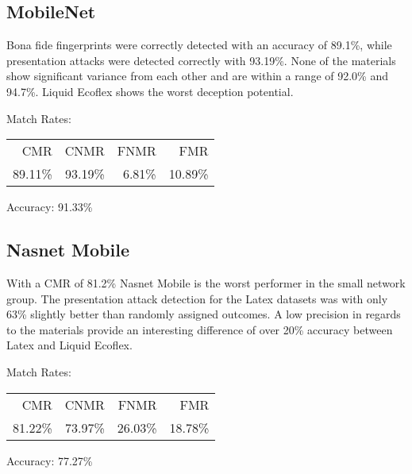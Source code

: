 \subsection{MobileNet}
\begin{minipage}[c]{0.7\textwidth}
    Bona fide fingerprints were correctly detected with an accuracy of 89.1\%, while presentation attacks were detected correctly with 93.19\%.
    None of the materials show significant variance from each other and are within a range of 92.0\% and 94.7\%.
    Liquid Ecoflex shows the worst deception potential.

    \medskip\centering Match Rates: 
    \begin{tabular}{ r  r  r  r |}
        CMR     & CNMR          & FNMR                 & FMR    \\
        89.11\% & 93.19\%       & 6.81\%               & 10.89\% \\
    \end{tabular} \hspace{2mm} Accuracy: 91.33\%
\end{minipage}
\hfill
\begin{minipage}[c]{0.3\textwidth}
    \centering
    
\end{minipage}



\subsection{Nasnet Mobile}
\begin{minipage}[c]{0.7\textwidth}

    With a CMR of 81.2\% Nasnet Mobile is the worst performer in the small network group.
    The presentation attack detection for the Latex datasets was with only 63\% slightly better than randomly assigned outcomes.
    A low precision in regards to the materials provide an interesting difference of over 20\% accuracy between Latex and Liquid Ecoflex.

    \medskip\centering Match Rates: 
    \begin{tabular}{ r  r  r  r |}
        CMR     & CNMR          & FNMR                 & FMR     \\
        81.22\% & 73.97\%       & 26.03\%              & 18.78\%  \\
    \end{tabular} \hspace{2mm} Accuracy: 77.27\%
\end{minipage}
\hfill
\begin{minipage}[c]{0.3\textwidth}
    \centering
    
\end{minipage}



